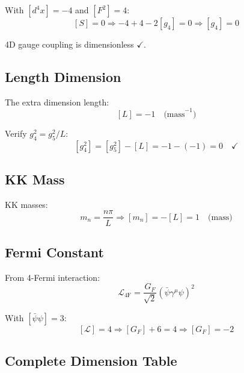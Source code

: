 \documentclass[11pt,a4paper]{article}
\begin{document}
With $[d^4x] = -4$ and $[F^2] = 4$:
\begin{equation}
\label{eq:g4-dim-derive}
[S] = 0 \Rightarrow -4 + 4 - 2[g_4] = 0 \Rightarrow [g_4] = 0
\end{equation}

4D gauge coupling is dimensionless $\checkmark$.

\subsection{Length Dimension}
\label{app:length-dim}

The extra dimension length:
\begin{equation}
\label{eq:L-dim}
[L] = -1 \quad \text{(mass}^{-1}\text{)}
\end{equation}

Verify $g_4^2 = g_5^2/L$:
\begin{equation}
\label{eq:g4-g5-dim-check}
[g_4^2] = [g_5^2] - [L] = -1 - (-1) = 0 \quad \checkmark
\end{equation}

\subsection{KK Mass}
\label{app:kk-mass-dim}

KK masses:
\begin{equation}
\label{eq:mn-dim}
m_n = \frac{n\pi}{L} \Rightarrow [m_n] = -[L] = 1 \quad \text{(mass)}
\end{equation}

\subsection{Fermi Constant}
\label{app:fermi-dim}

From 4-Fermi interaction:
\begin{equation}
\label{eq:fermi-interaction}
\mathcal{L}_{\text{4F}} = \frac{G_F}{\sqrt{2}} (\bar{\psi}\gamma^\mu\psi)^2
\end{equation}

With $[\bar{\psi}\psi] = 3$:
\begin{equation}
\label{eq:gf-dim-derive}
[\mathcal{L}] = 4 \Rightarrow [G_F] + 6 = 4 \Rightarrow [G_F] = -2
\end{equation}

\subsection{Complete Dimension Table}
\label{app:dim-table}
\end{document}
